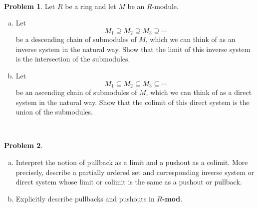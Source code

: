 \documentclass[11pt]{article}
\theoremstyle{definition}
\newtheorem{problem}{Problem}
\begin{document}
\

\begin{problem}
Let $R$ be a ring and let $M$ be an $R$-module.
\begin{enumerate}[a)]
	\item Let
$$M_1 \supseteq M_2 \supseteq M_3 \supseteq \cdots$$
be a descending chain of submodules of $M$, which we can think of as an inverse system in the natural way. Show that the limit of this inverse system is the intersection of the submodules.
\item Let 
$$M_1 \subseteq M_2 \subseteq M_3 \subseteq \cdots$$
be an ascending chain of submodules of $M$, which we can think of as a direct system in the natural way. Show that the colimit of this direct system is the union of the submodules.
\end{enumerate}
\end{problem}


\


\begin{problem}$\,$
\begin{enumerate}[a)]
	\item Interpret the notion of pullback as a limit and a pushout as a colimit. More precisely, describe a partially ordered set and corresponding inverse system or direct system whose limit or colimit is the same as a pushout or pullback.
\item Explicitly describe pullbacks and pushouts in {\bf $R$-mod}.
\end{enumerate}
\end{problem}
\end{document}
